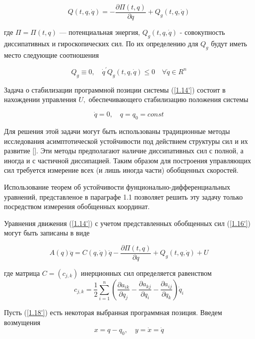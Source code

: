 \begin{equation} \label{1.16'}
Q(t, q, \dot q) = -\frac{\partial \Pi (t, q)}{\partial q} + Q_g (t, q, \dot q)
\end{equation}

 где $\Pi = \Pi(t, q)$ --- потенциальная энергия, $Q_g(t, q, \dot q)$ - совокупность диссипативных и гироскопических сил. По их определению для $Q_g$ будут иметь место следующие соотношения
 
 \begin{equation} \label{1.17'}
   Q_g \equiv 0, \quad \dot q^{'} Q_g (t, q, \dot q) \le 0 \quad \forall \dot q \in R^n
 \end{equation}
 
Задача о стабилизации программной позиции системы (\ref{1.14'}) состоит в нахождении управления $U,$ обеспечивающего стабилизацию положения системы 

\begin{equation} \label{1.18'}
\dot q = 0, \quad q = q_0 = const
\end{equation}

Для решения этой задачи могут быть использованы традиционные методы исследования асимптотической устойчивости под действием структуры сил и их развитие []. Эти методы предполагают наличие диссипативных сил с полной, а иногда и с частичной диссипацией. Таким образом для построения управляющих сил требуется измерение всех (и лишь иногда части) обобщенных скоростей. 

Использование теорем об устойчивости фунционально-дифференциальных уравнений, представленое в параграфе 1.1 позволяет решить эту задачу только посредством измерения обобщенных координат.

Уравнения движения (\ref{1.14'}) с учетом представленных обобщенных сил (\ref{1.16'}) могут быть записаны в виде 

 \begin{equation} \label{1.19'}
 A(q) \ddot q = C(q, \dot q) \dot q - \frac{\partial \Pi(t, q)}{\partial q} + Q_g(t, q, \dot q) + U
 \end{equation}

 где матрица $C = (c_{j,k})$ инерционных сил определяется равенством 
 $$c_{j,k} = \frac12 \sum\limits_{i =1}^{n} (\frac{\partial a_{ik} } {\partial q_j} - \frac{\partial a_{kj}}{\partial q_i} - \frac{\partial a_{ij}}{\partial q_k}) \dot q_i$$

Пусть (\ref{1.18'}) есть некоторая выбранная программная позиция. Введем возмущения
\begin{equation} \label{1.20'}
x = q - q_0, \quad y = \dot x = \dot q
\end{equation}
 
